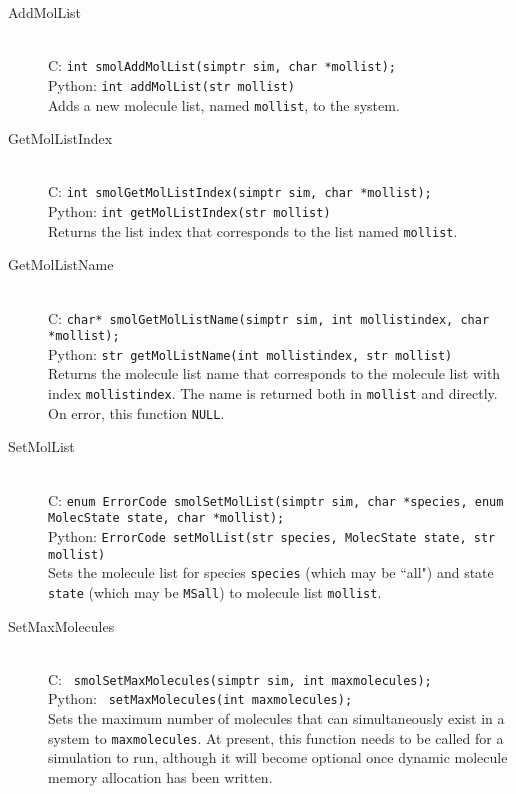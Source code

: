 \documentclass {book}
\begin{document}
\begin{description}
\item[AddMolList]
\hfill \\
C: \texttt{int smolAddMolList(simptr sim, char *mollist);}\\
Python: \texttt{int addMolList(str mollist)}\\
Adds a new molecule list, named \texttt{mollist}, to the system.

\item[GetMolListIndex]
\hfill \\
C: \texttt{int smolGetMolListIndex(simptr sim, char *mollist);}\\
Python: \texttt{int getMolListIndex(str mollist)}\\
Returns the list index that corresponds to the list named \texttt{mollist}.

\item[GetMolListName]
\hfill \\
C: \texttt{char* smolGetMolListName(simptr sim, int mollistindex, char *mollist);}\\
Python: \texttt{str getMolListName(int mollistindex, str mollist)}\\
Returns the molecule list name that corresponds to the molecule list with index \texttt{mollistindex}. The name is returned both in \texttt{mollist} and directly. On error, this function \texttt{NULL}.

\item[SetMolList]
\hfill \\
C: \texttt{enum ErrorCode smolSetMolList(simptr sim, char *species, enum MolecState state, char *mollist);}\\
Python: \texttt{ErrorCode setMolList(str species, MolecState state, str mollist)}\\
Sets the molecule list for species \texttt{species} (which may be ``all") and state \texttt{state} (which may be \texttt{MSall}) to molecule list \texttt{mollist}.

\item[SetMaxMolecules]
\hfill \\
C: \texttt{ smolSetMaxMolecules(simptr sim, int maxmolecules);}\\
Python: \texttt{ setMaxMolecules(int maxmolecules);}\\
Sets the maximum number of molecules that can simultaneously exist in a system to \texttt{maxmolecules}. At present, this function needs to be called for a simulation to run, although it will become optional once dynamic molecule memory allocation has been written.


\end{description}
\end{document}
